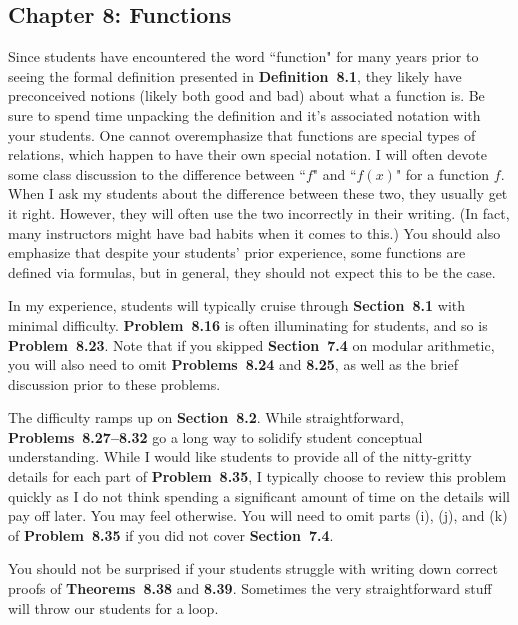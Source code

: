 \documentclass[11pt]{article}%
\newcommand{\blankline}{\pagebreak[2]\vspace{.5\baselineskip}}
\begin{document}

\subsection*{Chapter 8: Functions}


Since students have encountered the word ``function" for many years prior to seeing the formal definition presented in \textbf{Definition~8.1}, they likely have preconceived notions (likely both good and bad) about what a function is.  Be sure to spend time unpacking the definition and it's associated notation with your students. One cannot overemphasize that functions are special types of relations, which happen to have their own special notation.  I will often devote some class discussion to the difference between ``$f$" and ``$f(x)$" for a function $f$. When I ask my students about the difference between these two, they usually get it right.  However, they will often use the two incorrectly in their writing. (In fact, many instructors might have bad habits when it comes to this.) You should also emphasize that despite your students' prior experience, some functions are defined via formulas, but in general, they should not expect this to be the case. 

\blankline

In my experience, students will typically cruise through \textbf{Section~8.1} with minimal difficulty.  \textbf{Problem~8.16} is often illuminating for students, and so is \textbf{Problem~8.23}.  Note that if you skipped \textbf{Section~7.4} on modular arithmetic, you will also need to omit \textbf{Problems~8.24} and \textbf{8.25}, as well as the brief discussion prior to these problems.

\blankline

The difficulty ramps up on \textbf{Section~8.2}. While straightforward, \textbf{Problems~8.27--8.32} go a long way to solidify student conceptual understanding.  While I would like students to provide all of the nitty-gritty details for each part of \textbf{Problem~8.35}, I typically choose to review this problem quickly as I do not think spending a significant amount of time on the details will pay off later.  You may feel otherwise.  You will need to omit parts (i), (j), and (k) of \textbf{Problem~8.35} if you did not cover \textbf{Section~7.4}.  

\blankline

You should not be surprised if your students struggle with writing down correct proofs of \textbf{Theorems~8.38} and \textbf{8.39}.  Sometimes the very straightforward stuff will throw our students for a loop.  
\end{document}
